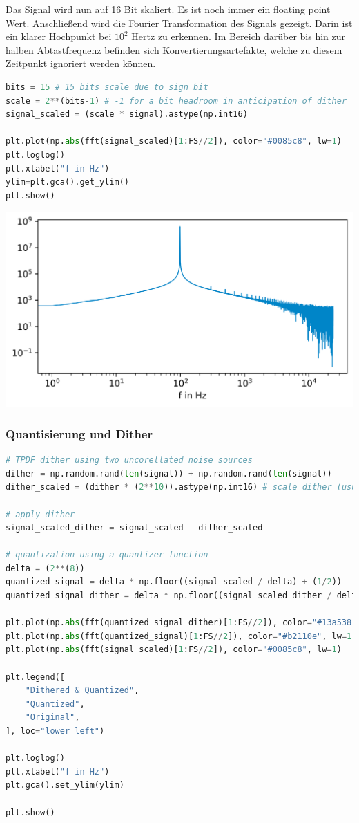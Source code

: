 Das Signal wird nun auf 16 Bit skaliert. Es ist noch immer ein
\gls{floating point} Wert. Anschließend wird die Fourier Transformation
des Signals gezeigt. Darin ist ein klarer Hochpunkt bei \(10^2\) Hertz
zu erkennen. Im Bereich darüber bis hin zur halben Abtastfrequenz
befinden sich Konvertierungsartefakte, welche zu diesem Zeitpunkt
ignoriert werden können.

\begin{lstlisting}[language=Python]
bits = 15 # 15 bits scale due to sign bit
scale = 2**(bits-1) # -1 for a bit headroom in anticipation of dither
signal_scaled = (scale * signal).astype(np.int16)

plt.plot(np.abs(fft(signal_scaled)[1:FS//2]), color="#0085c8", lw=1)
plt.loglog()
plt.xlabel("f in Hz")
ylim=plt.gca().get_ylim()
plt.show()
\end{lstlisting}

\includegraphics{./img/1e13dd00896ca85aa126ad99dcde56632518d4b2.png}

\hypertarget{quantisierung-und-dither}{%
\subsubsection{Quantisierung und
Dither}\label{quantisierung-und-dither}}

\begin{lstlisting}[language=Python]
# TPDF dither using two uncorellated noise sources
dither = np.random.rand(len(signal)) + np.random.rand(len(signal))
dither_scaled = (dither * (2**10)).astype(np.int16) # scale dither (usually only to 1 LSB)

# apply dither
signal_scaled_dither = signal_scaled - dither_scaled

# quantization using a quantizer function
delta = (2**(8))
quantized_signal = delta * np.floor((signal_scaled / delta) + (1/2))
quantized_signal_dither = delta * np.floor((signal_scaled_dither / delta) + (1/2))

plt.plot(np.abs(fft(quantized_signal_dither)[1:FS//2]), color="#13a538", lw=1)
plt.plot(np.abs(fft(quantized_signal)[1:FS//2]), color="#b2110e", lw=1)
plt.plot(np.abs(fft(signal_scaled)[1:FS//2]), color="#0085c8", lw=1)

plt.legend([
    "Dithered & Quantized",
    "Quantized",
    "Original",
], loc="lower left")

plt.loglog()
plt.xlabel("f in Hz")
plt.gca().set_ylim(ylim)

plt.show()
\end{lstlisting}

